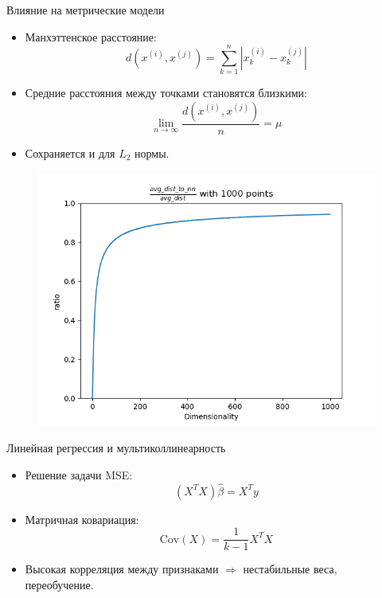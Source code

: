 \begin{frame}{Влияние на метрические модели}
    \begin{itemize}
        \item Манхэттенское расстояние:
              \begin{equation*}
                  d(x^{(i)}, x^{(j)}) = \sum_{k=1}^n |x_k^{(i)} - x_k^{(j)}|
              \end{equation*}
        \item Средние расстояния между точками становятся близкими:
              \begin{equation*}
                  \lim_{n\to\infty}\frac{d(x^{(i)}, x^{(j)})}{n} = \mu
              \end{equation*}
        \item Сохраняется и для $L_2$ нормы.
    \end{itemize}
    \begin{figure}
        \centering
        \includegraphics[width=.7\textwidth]{../resources/motivation/ratio.png}
    \end{figure}
\end{frame}

\begin{frame}{Линейная регрессия и мультиколлинеарность}
    \begin{itemize}
        \item Решение задачи MSE:
              \begin{equation*}
                  (X^TX)\hat{\beta} = X^Ty
              \end{equation*}
        \item Матричная ковариация:
              \begin{equation*}
                  \mathrm{Cov}(X) = \frac{1}{k-1}X^TX
              \end{equation*}
        \item Высокая корреляция между признаками \(\Rightarrow\) нестабильные веса, переобучение.
    \end{itemize}
\end{frame}

